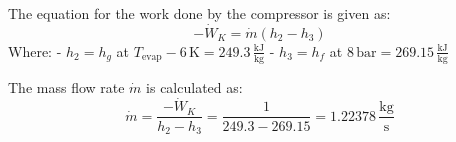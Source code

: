 The equation for the work done by the compressor is given as:  
\[
-\dot{W}_K = \dot{m} \left( h_2 - h_3 \right)
\]  
Where:  
- \( h_2 = h_g \) at \( T_{\text{evap}} - 6 \, \text{K} = 249.3 \, \frac{\text{kJ}}{\text{kg}} \)  
- \( h_3 = h_f \) at \( 8 \, \text{bar} = 269.15 \, \frac{\text{kJ}}{\text{kg}} \)  

The mass flow rate \( \dot{m} \) is calculated as:  
\[
\dot{m} = \frac{-\dot{W}_K}{h_2 - h_3} = \frac{1}{249.3 - 269.15} = 1.22378 \, \frac{\text{kg}}{\text{s}}
\]
